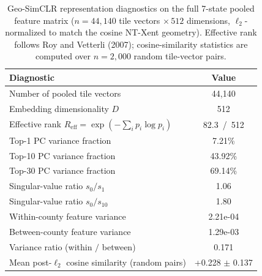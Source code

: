\begin{table}[H]
\centering
\caption{Geo-SimCLR representation diagnostics on the full 7-state pooled feature matrix
($n\!=\!44{,}140$ tile vectors $\times\,512$ dimensions, $\ell_2$-normalized to match the cosine NT-Xent geometry).
Effective rank follows Roy and Vetterli (2007); cosine-similarity statistics are computed over
$n\!=\!2{,}000$ random tile-vector pairs.}
\label{tab:effrank}
\begin{tabular}{lc}
\toprule
\textbf{Diagnostic} & \textbf{Value} \\
\midrule
Number of pooled tile vectors & 44,140 \\
Embedding dimensionality $D$ & 512 \\
Effective rank $R_\mathrm{eff} = \exp(-\sum_i p_i \log p_i)$ & 82.3 \,/\, 512 \\
Top-1 PC variance fraction & 7.21\% \\
Top-10 PC variance fraction & 43.92\% \\
Top-30 PC variance fraction & 69.14\% \\
Singular-value ratio $s_0/s_1$ & 1.06 \\
Singular-value ratio $s_0/s_{10}$ & 1.80 \\
Within-county feature variance & 2.21e-04 \\
Between-county feature variance & 1.29e-03 \\
Variance ratio (within $/$ between) & 0.171 \\
Mean post-$\ell_2$ cosine similarity (random pairs) & +0.228 $\pm$ 0.137 \\
\bottomrule
\end{tabular}
\end{table}
